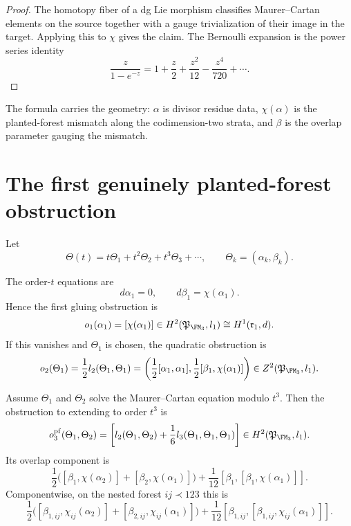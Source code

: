 \begin{proof}
The homotopy fiber of a dg Lie morphism classifies Maurer--Cartan elements on
the source together with a gauge trivialization of their image in the target.
Applying this to $\chi$ gives the claim. The Bernoulli expansion is the power
series identity
\[
\frac{z}{1-e^{-z}}=1+\frac z2+\frac{z^2}{12}-\frac{z^4}{720}+\cdots.
\]
\end{proof}

The formula carries the geometry: $\alpha$ is divisor residue data, $\chi(\alpha)$
is the planted-forest mismatch along the codimension-two strata, and $\beta$ is
the overlap parameter gauging the mismatch.

\section{The first genuinely planted-forest obstruction}

Let
\[
\Theta(t)=t\Theta_1+t^2\Theta_2+t^3\Theta_3+\cdots,
\qquad
\Theta_k=(\alpha_k,\beta_k).
\]

\begin{proposition}
\label{prop:fm3-first-second-synthesis}
The order-$t$ equations are
\[
d\alpha_1=0,
\qquad
 d\beta_1=\chi(\alpha_1).
\]
Hence the first gluing obstruction is
\[
o_1(\alpha_1)=[\chi(\alpha_1)]\in H^2(\mathfrak P_{\FM_3},l_1)\cong H^1(\mathfrak r_1,d).
\]
If this vanishes and $\Theta_1$ is chosen, the quadratic obstruction is
\[
o_2(\Theta_1)=\frac12l_2(\Theta_1,\Theta_1)
=\left(\frac12[\alpha_1,\alpha_1],\frac12[\beta_1,\chi(\alpha_1)]\right)
\in Z^2(\mathfrak P_{\FM_3},l_1).
\]
\end{proposition}

\begin{theorem}
\label{thm:fm3-higher-obstruction-synthesis}
Assume $\Theta_1$ and $\Theta_2$ solve the Maurer--Cartan equation modulo $t^3$.
Then the obstruction to extending to order $t^3$ is
\[
o^{\mathrm{pf}}_3(\Theta_1,\Theta_2)
=
\left[l_2(\Theta_1,\Theta_2)+\frac16l_3(\Theta_1,\Theta_1,\Theta_1)\right]
\in H^2(\mathfrak P_{\FM_3},l_1).
\]
Its overlap component is
\begin{equation}
\label{eq:pf-cubic-overlap-synthesis}
\frac12\bigl([\beta_1,\chi(\alpha_2)] + [\beta_2,\chi(\alpha_1)]\bigr)
+ \frac1{12}[\beta_1,[\beta_1,\chi(\alpha_1)]].
\end{equation}
Componentwise, on the nested forest $ij\prec 123$ this is
\[
\frac12\bigl([\beta_{1,ij},\chi_{ij}(\alpha_2)] + [\beta_{2,ij},\chi_{ij}(\alpha_1)]\bigr)
+ \frac1{12}[\beta_{1,ij},[\beta_{1,ij},\chi_{ij}(\alpha_1)]].
\]
\end{theorem}

